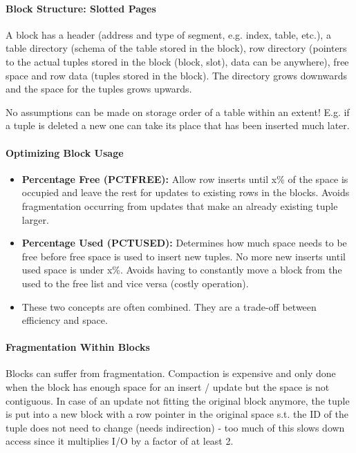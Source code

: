 \paragraph{Block Structure: Slotted Pages}
A block has a header (address and type of segment, e.g. index, table, etc.), a table directory (schema of the table stored in the block), row directory (pointers to the actual tuples stored in the block (block, slot), data can be anywhere), free space and row data (tuples stored in the block). The directory grows downwards and the space for the tuples grows upwards.

No assumptions can be made on storage order of a table within an extent! E.g. if a tuple is deleted a new one can take its place that has been inserted much later.

\paragraph{Optimizing Block Usage}
\begin{itemize}
    \item \textbf{Percentage Free (PCTFREE):} Allow row inserts until x\% of the space is occupied and leave the rest for updates to existing rows in the blocks. Avoids fragmentation occurring from updates that make an already existing tuple larger. 
    \item \textbf{Percentage Used (PCTUSED):} Determines how much space needs to be free before free space is used to insert new tuples. No more new inserts until used space is under x\%. Avoids having to constantly move a block from the used to the free list and vice versa (costly operation).
    \item These two concepts are often combined. They are a trade-off between efficiency and space.
\end{itemize}

\paragraph{Fragmentation Within Blocks}
Blocks can suffer from fragmentation. Compaction is expensive and only done when the block has enough space for an insert / update but the space is not contiguous. In case of an update not fitting the original block anymore, the tuple is put into a new block with a row pointer in the original space s.t. the ID of the tuple does not need to change (needs indirection) - too much of this slows down access since it multiplies I/O by a factor of at least 2.

